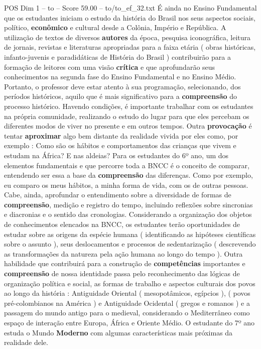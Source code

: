 \begin{textsample}{POS Dim 1 – to – Score 59.00 – to/to\_ef\_32.txt}
É ainda no Ensino Fundamental que os estudantes iniciam o estudo da história do Brasil nos seus aspectos sociais, político, \textbf{econômico} e cultural desde a Colônia, Império e República.
A utilização de textos de diversos \textbf{autores} da época, pesquisa iconográfica, leitura de jornais, revistas e literaturas apropriadas para a faixa etária ( obras históricas, infanto-juvenis e paradidáticas de História do Brasil ) contribuirão para a formação de leitores com uma visão \textbf{crítica} e que aprofundarão seus conhecimentos na segunda fase do Ensino Fundamental e no Ensino Médio.
Portanto, o professor deve estar atento à sua programação, selecionando, dos períodos históricos, aquilo que é mais significativo para a \textbf{compreensão} do processo histórico.
Havendo condições, é importante trabalhar com os estudantes na própria comunidade, realizando o estudo do lugar para que eles percebam os diferentes modos de viver no presente e em outros tempos.
Outra \textbf{provocação} é tentar \textbf{aproximar} algo bem distante da realidade vivida por eles como, por exemplo : Como são os hábitos e comportamentos das crianças que vivem e estudam na África?
E nas aldeias?
Para os estudantes do 6º ano, um dos elementos fundamentais e que percorre toda a BNCC é o conceito de comparar, entendendo ser essa a base da \textbf{compreensão} das diferenças.
Como por exemplo, eu comparo os meus hábitos, a minha forma de vida, com os de outras pessoas.
Cabe, ainda, aprofundar o entendimento sobre a diversidade de formas de \textbf{compreensão}, medição e registro do tempo, incluindo reflexões sobre sincronias e diacronias e o sentido das cronologias.
Considerando a organização dos objetos de conhecimentos elencados na BNCC, os estudantes terão oportunidades de estudar sobre as origens da espécie humana ( identificando as hipóteses científicas sobre o assunto ), seus deslocamentos e processos de sedentarização ( descrevendo as transformações da natureza pela ação humana ao longo do tempo ).
Outra habilidade que contribuirá para a construção de \textbf{competências} importantes e \textbf{compreensão} de nossa identidade passa pelo reconhecimento das lógicas de organização política e social, as formas de trabalho e aspectos culturais dos povos ao longo da história : Antiguidade Oriental ( mesopotâmicos, egípcios ), ( povos pré-colombianos na América ) e Antiguidade Ocidental ( gregos e romanos ) e a passagem do mundo antigo para o medieval, considerando o Mediterrâneo como espaço de interação entre Europa, África e Oriente Médio.
O estudante do 7º ano estuda o Mundo \textbf{Moderno} com algumas características mais próximas da realidade dele.

\end{textsample}
